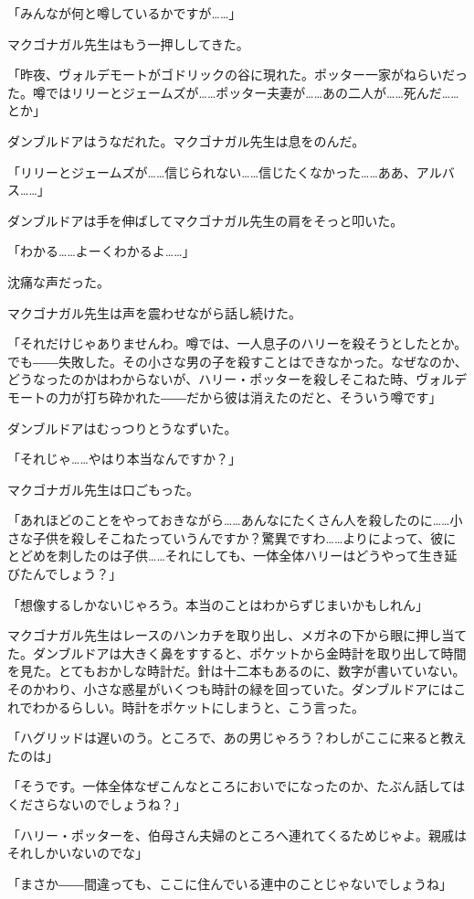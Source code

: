 \documentclass[10pt,a4paper]{article}
\begin{document}
\begin{CJK}{UTF8}{min}
「みんなが何と噂しているかですが……」

マクゴナガル先生はもう一押ししてきた。

「昨夜、ヴォルデモートがゴドリックの谷に現れた。ポッター一家がねらいだった。噂ではリリーとジェームズが……ポッター夫妻が……あの二人が……死んだ……とか」

ダンブルドアはうなだれた。マクゴナガル先生は息をのんだ。

「リリーとジェームズが……信じられない……信じたくなかった……ああ、アルバス……」

ダンブルドアは手を伸ばしてマクゴナガル先生の肩をそっと叩いた。

「わかる……よーくわかるよ……」

沈痛な声だった。

マクゴナガル先生は声を震わせながら話し続けた。

「それだけじゃありませんわ。噂では、一人息子のハリーを殺そうとしたとか。でも――失敗した。その小さな男の子を殺すことはできなかった。なぜなのか、どうなったのかはわからないが、ハリー・ポッターを殺しそこねた時、ヴォルデモートの力が打ち砕かれた――だから彼は消えたのだと、そういう噂です」

ダンブルドアはむっつりとうなずいた。

「それじゃ……やはり本当なんですか？」

マクゴナガル先生は口ごもった。

「あれほどのことをやっておきながら……あんなにたくさん人を殺したのに……小さな子供を殺しそこねたっていうんですか？驚異ですわ……よりによって、彼にとどめを刺したのは子供……それにしても、一体全体ハリーはどうやって生き延びたんでしょう？」

「想像するしかないじゃろう。本当のことはわからずじまいかもしれん」

マクゴナガル先生はレースのハンカチを取り出し、メガネの下から眼に押し当てた。ダンブルドアは大きく鼻をすすると、ポケットから金時計を取り出して時間を見た。とてもおかしな時計だ。針は十二本もあるのに、数字が書いていない。そのかわり、小さな惑星がいくつも時計の緑を回っていた。ダンブルドアにはこれでわかるらしい。時計をポケットにしまうと、こう言った。

「ハグリッドは遅いのう。ところで、あの男じゃろう？わしがここに来ると教えたのは」

「そうです。一体全体なぜこんなところにおいでになったのか、たぶん話してはくださらないのでしょうね？」

「ハリー・ポッターを、伯母さん夫婦のところへ連れてくるためじゃよ。親戚はそれしかいないのでな」

「まさか――間違っても、ここに住んでいる連中のことじゃないでしょうね」


\end{CJK}
\end{document}
